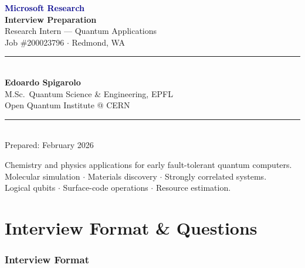 \documentclass[11pt,a4paper]{article}
\begin{document}
\begin{titlepage}
\centering
\vspace*{2cm}

{\Huge\bfseries\textcolor{darkblue}{Microsoft Research}}\\[0.5cm]
{\Huge\bfseries\textcolor{msblue}{Interview Preparation}}\\[1.5cm]

{\LARGE Research Intern --- Quantum Applications}\\[0.3cm]
{\large Job \#200023796 $\cdot$ Redmond, WA}\\[2cm]

\rule{\textwidth}{1pt}\\[0.8cm]
{\Large\textbf{Edoardo Spigarolo}}\\[0.3cm]
{\large M.Sc.\ Quantum Science \& Engineering, EPFL}\\[0.3cm]
{\large Open Quantum Institute @ CERN}\\[0.8cm]
\rule{\textwidth}{1pt}\\[2cm]

{\large Prepared: February 2026}\\[3cm]

\begin{importantbox}[Scope]
Chemistry and physics applications for early fault-tolerant quantum computers.\\
Molecular simulation $\cdot$ Materials discovery $\cdot$ Strongly correlated systems.\\
Logical qubits $\cdot$ Surface-code operations $\cdot$ Resource estimation.
\end{importantbox}

\end{titlepage}

\tableofcontents
\newpage

\part{Interview Format \& Questions}

\section{Interview Format}
\end{document}
